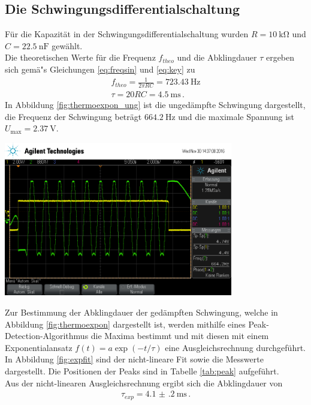 \documentclass[]{scrartcl}
\begin{document}
\subsection{Die Schwingungsdifferentialschaltung}
Für die Kapazität in der Schwingungsdifferentialschaltung wurden $R=\SI{10}{\kilo\ohm}$ und \\ $C=\SI{22.5}{\nano\farad}$ gewählt. \\
Die theoretischen Werte für die Frequenz $f_{theo}$ und die Abklingdauer $\tau$ ergeben sich gemä"s Gleichungen \ref{eq:freqsin} und \ref{eq:key} zu
\begin{align}
f_{theo} = \frac{1}{2\pi RC}=\SI{723.43}{\hertz} \\
\tau = 20RC=\SI{4.5}{\milli\second}\,.
\end{align}
In Abbildung \ref{fig:thermoexpon_ung} ist die ungedämpfte Schwingung dargestellt, die Frequenz der Schwingung beträgt $\SI{664.2}{\hertz}$ und die maximale Spannung ist $U_{\text{max}}=\SI{2.37}{\volt}$.
\begin{center}
	\includegraphics[width=10cm]{images/schwingung.png}
	\label{fig:thermoexpon_ung}
\end{center}
Zur Bestimmung der Abklingdauer der gedämpften Schwingung, welche in Abbildung \ref{fig:thermoexpon} dargestellt ist, werden mithilfe eines Peak-Detection-Algorithmus die Maxima bestimmt und mit diesen mit einem Exponentialansatz $f(t)=a\exp\left(-t/\tau\right) $ eine Ausgleichsrechnung durchgeführt. In Abbildung \ref{fig:expfit} sind der nicht-lineare Fit sowie die Messwerte dargestellt. Die Positionen der Peaks sind in Tabelle \ref{tab:peak} aufgeführt.\\
Aus der nicht-linearen Ausgleichsrechnung ergibt sich die Abklingdauer von
\begin{align*}
\tau_{exp}=\SI{4.1(2)}{\milli\second}\,.
\end{align*}
\end{document}
